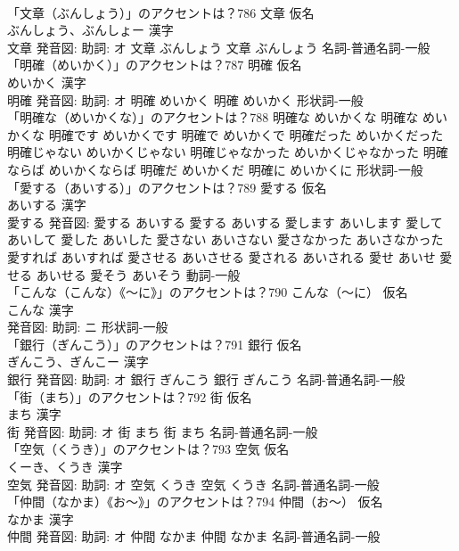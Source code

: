 \documentclass[8pt]{extreport}
\begin{document}
\begin{CJK}{UTF8}{min}
\\	「文章（ぶんしょう）」のアクセントは？786	文章 仮名　
\\	ぶんしょう、ぶんしょー 漢字　
\\	文章 発音図: 助詞: オ	文章 ぶんしょう		文章 ぶんしょう				名詞-普通名詞-一般 
\\	「明確（めいかく）」のアクセントは？787	明確 仮名　
\\	めいかく 漢字　
\\	明確 発音図: 助詞: オ	明確 めいかく		明確 めいかく				形状詞-一般 
\\	「明確な（めいかくな）」のアクセントは？788		明確な めいかくな		明確な めいかくな 明確です めいかくです 明確で めいかくで 明確だった めいかくだった 明確じゃない めいかくじゃない 明確じゃなかった めいかくじゃなかった 明確ならば めいかくならば 明確だ めいかくだ 明確に めいかくに				形状詞-一般 
\\	「愛する（あいする）」のアクセントは？789	愛する 仮名　
\\	あいする 漢字　
\\	愛する 発音図:	愛する あいする		愛する あいする 愛します あいします 愛して あいして 愛した あいした 愛さない あいさない 愛さなかった あいさなかった 愛すれば あいすれば 愛させる あいさせる 愛される あいされる 愛せ あいせ 愛せる あいせる 愛そう あいそう				動詞-一般 
\\	「こんな（こんな）《〜に》」のアクセントは？790	こんな（〜に） 仮名　
\\	こんな 漢字　
\\	発音図: 助詞: ニ							形状詞-一般 
\\	「銀行（ぎんこう）」のアクセントは？791	銀行 仮名　
\\	ぎんこう、ぎんこー 漢字　
\\	銀行 発音図: 助詞: オ	銀行 ぎんこう		銀行 ぎんこう				名詞-普通名詞-一般 
\\	「街（まち）」のアクセントは？792	街 仮名　
\\	まち 漢字　
\\	街 発音図: 助詞: オ	街 まち		街 まち				名詞-普通名詞-一般 
\\	「空気（くうき）」のアクセントは？793	空気 仮名　
\\	くーき、くうき 漢字　
\\	空気 発音図: 助詞: オ	空気 くうき		空気 くうき				名詞-普通名詞-一般 
\\	「仲間（なかま）《お〜》」のアクセントは？794	仲間（お〜） 仮名　
\\	なかま 漢字　
\\	仲間 発音図: 助詞: オ	仲間 なかま		仲間 なかま				名詞-普通名詞-一般 

\end{CJK}
\end{document}
